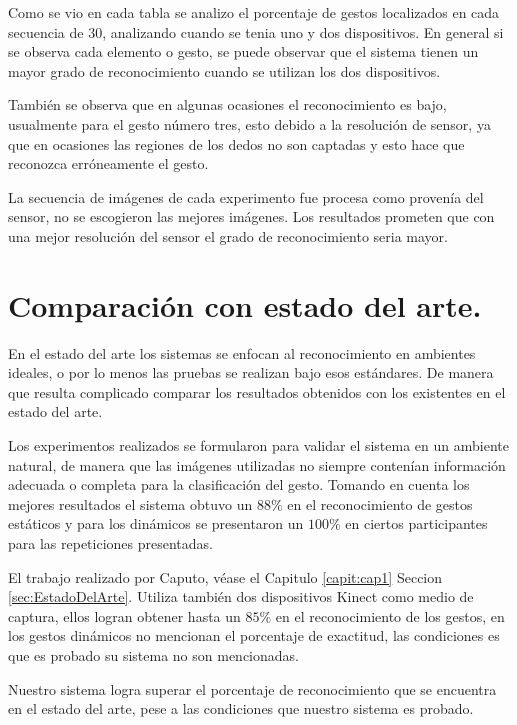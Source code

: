 Como se vio en cada tabla se analizo el porcentaje de gestos localizados en cada secuencia de $30$, analizando cuando se tenia uno y dos dispositivos. En general si se observa cada elemento o gesto, se puede observar que el sistema tienen un mayor grado de reconocimiento cuando se utilizan los dos dispositivos.    

También se observa que en algunas ocasiones el reconocimiento es bajo, usualmente para el gesto n\'umero tres, esto debido a la resolución de sensor, ya que en ocasiones las regiones de los dedos no son captadas y esto hace que reconozca erróneamente el gesto. 

La secuencia de imágenes de cada experimento fue procesa como provenía del sensor, no se escogieron las mejores imágenes. Los resultados prometen que con una mejor resolución del sensor el grado de reconocimiento seria mayor. 

\section{Comparación con estado del arte.}  

En el estado del arte los sistemas se enfocan al reconocimiento en ambientes ideales, o por lo menos las pruebas se realizan bajo esos estándares. De manera que resulta complicado comparar los resultados obtenidos con los existentes en el estado del arte.

Los experimentos realizados se formularon para validar el sistema en un ambiente natural, de manera que las imágenes utilizadas no siempre contenían información adecuada o completa para la clasificación del gesto. Tomando en cuenta los mejores resultados el sistema obtuvo un $88 \%$ en el reconocimiento de gestos estáticos y para los dinámicos se presentaron un $100 \%$ en ciertos participantes para las repeticiones presentadas. 

El trabajo realizado por Caputo, véase el Capitulo \ref{capit:cap1} Seccion \ref{sec:EstadoDelArte}. Utiliza también dos dispositivos Kinect como medio de captura, ellos logran obtener hasta un $85 \%$ en el reconocimiento de los gestos, en los gestos dinámicos no mencionan el porcentaje de exactitud, las condiciones es que es probado su sistema no son mencionadas. 

Nuestro sistema logra superar el porcentaje de reconocimiento que se encuentra en el estado del arte, pese a las condiciones que nuestro sistema es probado.  


\newpage